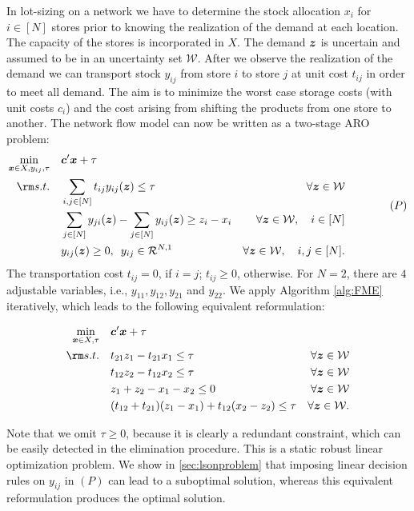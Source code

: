 \documentclass[fleqn,mnsc,blindrev]{informs4}
\newcommand{\mb}[1]{\mbox{\boldmath \ensuremath{#1}}}
\begin{document}
	\begin{example}  \label{exmp:lson}
		In lot-sizing on a network we have to determine the stock allocation $x_i$ for $i\in [N]$ stores prior to knowing the realization of the demand at each location. The capacity of the stores is incorporated in $X$. The demand $\mb{z}$ is uncertain and assumed to be in an uncertainty set $\mathcal{W}$. After we observe the realization of the demand we can transport stock $y_{ij}$ from store $i$ to store $j$ at unit cost $t_{ij}$ in order to meet all demand. The aim is to minimize the worst case storage costs (with unit costs $c_i$) and the cost arising from shifting the products from one store to another. The network flow model can now be written as a two-stage ARO problem:
\begin{equation*}
\begin{aligned} 
				\min_{ \boldsymbol{x} \in X, y_{ij}, \tau} \quad &  \mb{c}'\mb{x} + \tau \\
				{\rm s.t.}  \quad & \sum_{i,j\in [N]} t_{ij}y_{ij}(\mb{z}) \le \tau & \forall \mb{z} \in \mathcal{W} \\
				\quad & \sum_{j \in [N]} y_{ji}(\mb{z}) - \sum_{j \in [N]} y_{ij}(\mb{z}) \ge z_i - x_i   & \forall \mb{z} \in \mathcal{W}, \quad i \in [N]\\
				\quad & y_{ij}(\mb{z}) \ge 0, \,\,\,  y_{ij} \in \mathcal{R}^{N,1} & \forall \mb{z} \in \mathcal{W}, \quad i,j \in [N].
			\end{aligned} \qquad \qquad (P)
\end{equation*}
The transportation cost $t_{ij}= 0$, if $i= j$; $t_{ij} \ge 0$,  otherwise. For $N=2$, there are $4$ adjustable variables, i.e.,  $y_{11},  y_{12}, y_{21}$  and $y_{22}$. We apply Algorithm \ref{alg:FME} iteratively, which leads to the following equivalent reformulation:
\begin{minipage}{\textwidth}
\begin{align*}
			\min_{ \boldsymbol{x} \in X, \tau} \quad &  \mb{c}'\mb{x} + \tau \\
			{\rm s.t.}  \quad & t_{21}z_1 - t_{21}x_1 \le \tau & \forall \mb{z} \in \mathcal{W} \\
			\quad & t_{12}z_2 - t_{12}x_2 \le \tau & \forall \mb{z} \in \mathcal{W} \\
			\quad & z_1 + z_2 - x_1 - x_2  \le 0 & \forall \mb{z} \in \mathcal{W} \\
			\quad & (t_{12} + t_{21})(z_1-x_1) + t_{12}(x_2 - z_2) \le \tau & \forall \mb{z} \in \mathcal{W}.\\
\end{align*}
		\end{minipage}		
		Note that we omit $\tau \ge 0$, because it is clearly a redundant constraint, which can be easily detected in the elimination procedure. This is a static robust linear optimization problem. We show in \textsection \ref{sec:lsonproblem} that imposing linear decision rules on $ y_{ij}$ in $(P)$ can lead to a suboptimal solution, whereas this equivalent reformulation produces the optimal solution.   \hfill \Halmos
	\end{example}
	
\end{document}
